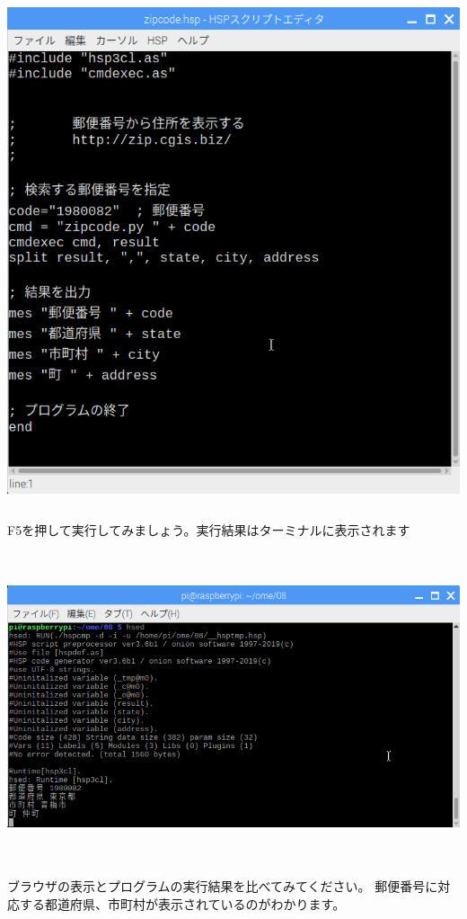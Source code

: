 \documentclass[a4paper,12pt,dvipdfmx]{jarticle}
\begin{document}
\begin{center}
\includegraphics[width=13.951cm,height=14.972cm]{textbook-img056.png}

\end{center}

\bigskip

\clearpage
F5を押して実行してみましょう。実行結果はターミナルに表示されます



\begin{center}
\includegraphics[width=17.006cm,height=9.086cm]{textbook-img057.png}

\end{center}
ブラウザの表示とプログラムの実行結果を比べてみてください。
郵便番号に対応する都道府県、市町村が表示されているのがわかります。
\end{document}
